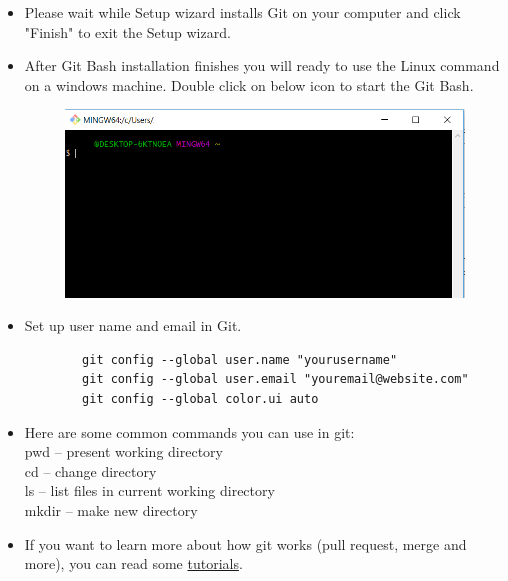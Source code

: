 \documentclass[11pt]{article} %
\begin{document}
\begin{itemize}
    	\item Please wait while Setup wizard installs Git on your computer and click "Finish" to exit the Setup wizard. 
    	\item After Git Bash installation finishes you will ready to use the Linux command on a windows machine. 
      Double click on below icon to start the Git Bash. 
    		\begin{figure}[h!]
    			\centering
    			\includegraphics[width=0.7\linewidth]{figs/Launch-Git-Bash.png}
    			\caption{}
    			\label{fig:launchgitbash}
    		\end{figure}
    	\item Set up user name and email in Git.
    	\begin{lstlisting}
    	git config --global user.name "yourusername"
    	git config --global user.email "youremail@website.com"
    	git config --global color.ui auto
    	\end{lstlisting}
    	\item Here are some common commands you can use in git:\\
    		pwd -- present working directory\\
    		cd -- change directory\\
    		ls -- list files in current working directory\\
    		mkdir -- make new directory\\
    	\item If you want to learn more about how git works (pull request, merge and more), you can read some \href{https://www.atlassian.com/git}{tutorials}. 
    	
    \end{itemize}
  
\end{document}
